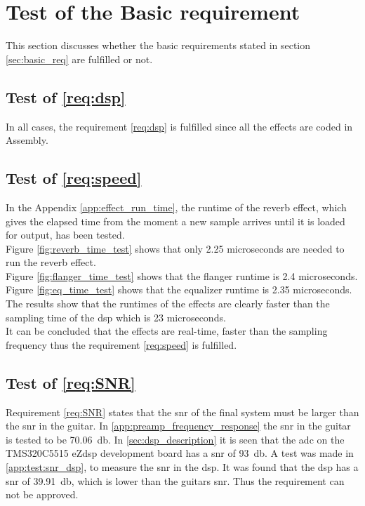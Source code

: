 \section{Test of the Basic requirement}
This section discusses whether the basic requirements stated in section \ref{sec:basic_req} are fulfilled or not. 

\subsection{Test of  \autoref{req:dsp}}
In all cases, the requirement \ref{req:dsp} is fulfilled since all the effects are coded in Assembly.


\subsection{Test of  \autoref{req:speed}}
In the Appendix \ref{app:effect_run_time}, the runtime of the reverb effect, which gives the elapsed time from the moment a new sample arrives until it is loaded for output, has been tested. \\
Figure \ref{fig:reverb_time_test} shows that only 2.25 microseconds are needed to run the \gls{reverb} effect. \\
Figure \ref{fig:flanger_time_test} shows that the flanger runtime is 2.4 microseconds. \\
Figure \ref{fig:eq_time_test} shows that the equalizer runtime is 2.35 microseconds. \\
The results show that the runtimes of the effects are clearly faster than the sampling time of the \gls{dsp} which is 23 microseconds. \\
It can be concluded that the effects are real-time, faster than the sampling frequency thus the requirement \ref{req:speed} is fulfilled. \\

\subsection{Test of \autoref{req:SNR}}
Requirement \autoref{req:SNR} states that the \gls{snr} of the final system must be larger than the \gls{snr} in the guitar. In \autoref{app:preamp_frequency_response} the \gls{snr} in the guitar is tested to be \SI{70.06}{\decibel}. In \autoref{sec:dsp_description} it is seen that the \gls{adc} on the TMS320C5515 eZdsp development board has a \gls{snr} of \SI{93}{\decibel}. A test was made in \autoref{app:test:snr_dsp}, to measure the \gls{snr} in the \gls{dsp}. It was found that the \gls{dsp} has a \gls{snr} of \SI{39.91}{\decibel}, which is lower than the guitars \gls{snr}. Thus the requirement can not be approved. 

